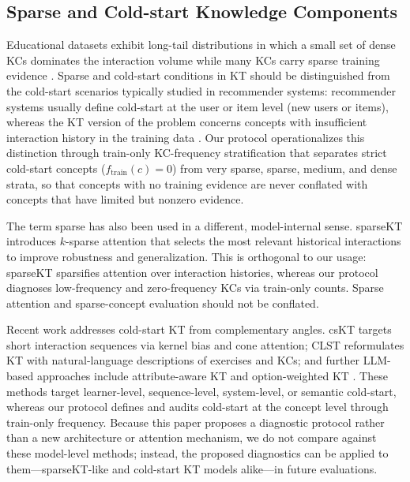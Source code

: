 \subsection{Sparse and Cold-start Knowledge Components}
Educational datasets exhibit long-tail distributions in which a small set of dense KCs dominates the interaction volume while many KCs carry sparse training evidence \citep{choi2020ednet,liu2023xes3g5m}. Sparse and cold-start conditions in KT should be distinguished from the cold-start scenarios typically studied in recommender systems: recommender systems usually define cold-start at the user or item level (new users or items), whereas the KT version of the problem concerns concepts with insufficient interaction history in the training data \citep{pelanek2015memory,choffin2019das3h}. Our protocol operationalizes this distinction through train-only KC-frequency stratification that separates strict cold-start concepts ($f_{\mathrm{train}}(c) = 0$) from very sparse, sparse, medium, and dense strata, so that concepts with no training evidence are never conflated with concepts that have limited but nonzero evidence.

The term sparse has also been used in a different, model-internal sense. sparseKT \citep{huang2023sparsekt} introduces $k$-sparse attention that selects the most relevant historical interactions to improve robustness and generalization. This is orthogonal to our usage: sparseKT sparsifies attention over interaction histories, whereas our protocol diagnoses low-frequency and zero-frequency KCs via train-only counts. Sparse attention and sparse-concept evaluation should not be conflated.

Recent work addresses cold-start KT from complementary angles. csKT \citep{bai2025cskt} targets short interaction sequences via kernel bias and cone attention; CLST \citep{jung2025clst} reformulates KT with natural-language descriptions of exercises and KCs; and further LLM-based approaches include attribute-aware KT \citep{guo2024mitigating} and option-weighted KT \citep{kim2024beyond}. These methods target learner-level, sequence-level, system-level, or semantic cold-start, whereas our protocol defines and audits cold-start at the concept level through train-only frequency. Because this paper proposes a diagnostic protocol rather than a new architecture or attention mechanism, we do not compare against these model-level methods; instead, the proposed diagnostics can be applied to them---sparseKT-like and cold-start KT models alike---in future evaluations.

